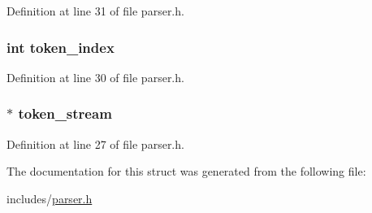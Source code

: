 Definition at line 31 of file parser.\+h.

\hypertarget{structparser_af8d23d2a00960ceeb60670a3558de069}{
\subsubsection[{token\+\_\+index}]{\setlength{\rightskip}{0pt plus 5cm}int token\+\_\+index}}\label{structparser_af8d23d2a00960ceeb60670a3558de069}


Definition at line 30 of file parser.\+h.

\hypertarget{structparser_a3b32179d2f774c0424b580ead35a17f8}{
\subsubsection[{token\+\_\+stream}]{$\ast$ token\+\_\+stream}}\label{structparser_a3b32179d2f774c0424b580ead35a17f8}


Definition at line 27 of file parser.\+h.



The documentation for this struct was generated from the following file\+:\begin{DoxyCompactItemize}
\item 
includes/\hyperlink{parser_8h}{parser.\+h}\end{DoxyCompactItemize}
